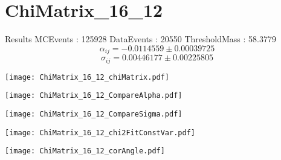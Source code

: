 \documentclass[a4paper,12pt]{article}
\begin{document}
\section{ChiMatrix\_16\_12}
\begin{minipage}{0.49\linewidth} Results \newline
MCEvents : 125928\newline
DataEvents : 20550 \newline
ThresholdMass : 58.3779\\
$$\alpha_{ij} = -0.0114559\pm 0.00039725$$
$$\sigma_{ij} = 0.00446177\pm 0.00225805$$
\end{minipage}\hfill
\begin{minipage}{0.49\linewidth} 
\texttt{[image: ChiMatrix\_16\_12\_chiMatrix.pdf]}\\
\end{minipage}
\hfill
\begin{minipage}{0.49\linewidth} 
\texttt{[image: ChiMatrix\_16\_12\_CompareAlpha.pdf]}\\
\end{minipage}
\hfill
\begin{minipage}{0.49\linewidth} 
\texttt{[image: ChiMatrix\_16\_12\_CompareSigma.pdf]}\\
\end{minipage}
\begin{minipage}{0.49\linewidth} 
\texttt{[image: ChiMatrix\_16\_12\_chi2FitConstVar.pdf]}\\
\end{minipage}
\hfill
\begin{minipage}{0.49\linewidth} 
\texttt{[image: ChiMatrix\_16\_12\_corAngle.pdf]}\\
\end{minipage}
\end{document}
